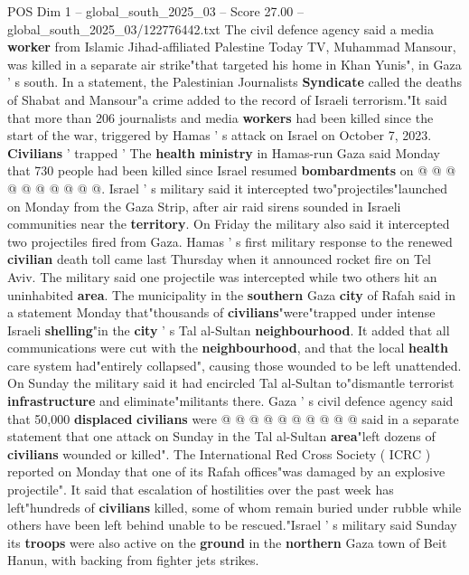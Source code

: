 \begin{textsample}{POS Dim 1 – global\_south\_2025\_03 – Score 27.00 – global\_south\_2025\_03/122776442.txt}
The civil defence agency said a media \textbf{worker} from Islamic Jihad-affiliated Palestine Today TV, Muhammad Mansour, was killed in a separate air strike"that targeted his home in Khan Yunis", in Gaza ' s south.
In a statement, the Palestinian Journalists \textbf{Syndicate} called the deaths of Shabat and Mansour"a crime added to the record of Israeli terrorism."It said that more than 206 journalists and media \textbf{workers} had been killed since the start of the war, triggered by Hamas ' s attack on Israel on October 7, 2023. \textbf{Civilians} ' trapped ' The \textbf{health} \textbf{ministry} in Hamas-run Gaza said Monday that 730 people had been killed since Israel resumed \textbf{bombardments} on @ @ @ @ @ @ @ @ @ @.
Israel ' s military said it intercepted two"projectiles"launched on Monday from the Gaza Strip, after air raid sirens sounded in Israeli communities near the \textbf{territory}.
On Friday the military also said it intercepted two projectiles fired from Gaza.
Hamas ' s first military response to the renewed \textbf{civilian} death toll came last Thursday when it announced rocket fire on Tel Aviv.
The military said one projectile was intercepted while two others hit an uninhabited \textbf{area}.
The municipality in the \textbf{southern} Gaza \textbf{city} of Rafah said in a statement Monday that"thousands of \textbf{civilians}"were"trapped under intense Israeli \textbf{shelling}"in the \textbf{city} ' s Tal al-Sultan \textbf{neighbourhood}.
It added that all communications were cut with the \textbf{neighbourhood}, and that the local \textbf{health} care system had"entirely collapsed", causing those wounded to be left unattended.
On Sunday the military said it had encircled Tal al-Sultan to"dismantle terrorist \textbf{infrastructure} and eliminate"militants there.
Gaza ' s civil defence agency said that 50,000 \textbf{displaced} \textbf{civilians} were @ @ @ @ @ @ @ @ @ @ said in a separate statement that one attack on Sunday in the Tal al-Sultan \textbf{area}"left dozens of \textbf{civilians} wounded or killed".
The International Red Cross Society ( ICRC ) reported on Monday that one of its Rafah offices"was damaged by an explosive projectile".
It said that escalation of hostilities over the past week has left"hundreds of \textbf{civilians} killed, some of whom remain buried under rubble while others have been left behind unable to be rescued."Israel ' s military said Sunday its \textbf{troops} were also active on the \textbf{ground} in the \textbf{northern} Gaza town of Beit Hanun, with backing from fighter jets strikes.

\end{textsample}
